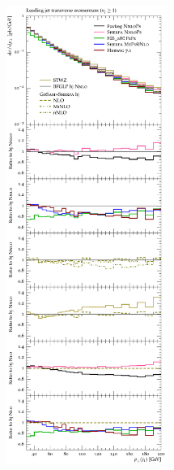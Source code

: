 \begin{figure}[p!]
  \centering
  \includegraphics[width=0.47\textwidth]{figures/hjetscomp_u_jet1_pT_incl.pdf}
  \hfill

\end{figure}
